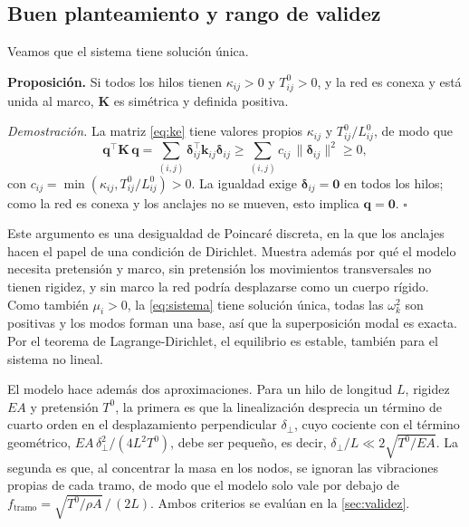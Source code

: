 \documentclass[fleqn,final]{jaes}
\begin{document}
\subsection{Buen planteamiento y rango de validez}\label{sec:justificacion}
Veamos que el sistema tiene solución única.  
 
\noindent\textbf{Proposición.} Si todos los hilos tienen $\kappa_{ij}>0$ y
$T^0_{ij}>0$, y la red es conexa y está unida al marco, $\mathbf{K}$ es
simétrica y definida positiva.

\textit{Demostración.} La matriz \cref{eq:ke} tiene valores propios
$\kappa_{ij}$ y $T^0_{ij}/L^0_{ij}$, de modo que
\begin{equation}
  \mathbf{q}^{\top}\mathbf{K}\,\mathbf{q}
  =\sum_{(i,j)}\boldsymbol{\delta}_{ij}^{\top}\mathbf{k}_{ij}\boldsymbol{\delta}_{ij}
  \ge\sum_{(i,j)}c_{ij}\,\lVert\boldsymbol{\delta}_{ij}\rVert^2\ge0,
  \label{eq:coercividad}
\end{equation}
con $c_{ij}=\min(\kappa_{ij},T^0_{ij}/L^0_{ij})>0$. La igualdad exige
$\boldsymbol{\delta}_{ij}=\mathbf{0}$ en todos los hilos; como la red es
conexa y los anclajes no se mueven, esto implica $\mathbf{q}=\mathbf{0}$.
$\square$

Este argumento es una desigualdad de Poincaré discreta, en la que los
anclajes hacen el papel de una condición de Dirichlet. Muestra además por
qué el modelo necesita pretensión y marco, sin pretensión los movimientos
transversales no tienen rigidez, y sin marco la red podría desplazarse
como un cuerpo rígido. Como también $\mu_i>0$, la \cref{eq:sistema} tiene
solución única, todas las $\omega_k^2$ son positivas y los modos forman
una base, así que la superposición modal es exacta. Por el teorema de
Lagrange-Dirichlet, el equilibrio es estable, también para el sistema no
lineal.

El modelo hace además dos aproximaciones. Para un hilo de longitud $L$,
rigidez $EA$ y pretensión $T^0$, la primera es que la linealización desprecia un término de cuarto orden en el
desplazamiento perpendicular $\delta_\perp$, cuyo cociente con el término
geométrico, $EA\,\delta_\perp^2/(4L^2T^0)$, debe ser pequeño, es decir,
$\delta_\perp/L\ll2\sqrt{T^0/EA}$. La segunda es que, al concentrar la masa en
los nodos, se ignoran las vibraciones propias de cada tramo, de modo que
el modelo solo vale por debajo de
$f_{\mathrm{tramo}}=\sqrt{T^0/\rho A}\,/\,(2L)$. Ambos criterios se
evalúan en la \cref{sec:validez}.

\end{document}
